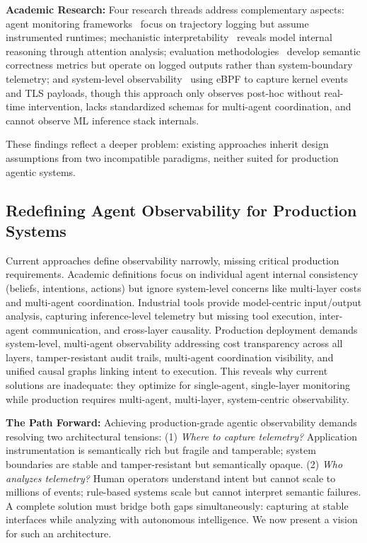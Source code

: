 \documentclass[sigplan,screen,9pt]{acmart}
\begin{document}
\textbf{Academic Research:} Four research threads address complementary aspects: agent monitoring frameworks~\cite{Rombaut2025Watson,Dong2024AgentOps} focus on trajectory logging but assume instrumented runtimes; mechanistic interpretability~\cite{Kim2025AgenticInterp} reveals model internal reasoning through attention analysis; evaluation methodologies~\cite{Moshkovich2025Pipeline} develop semantic correctness metrics but operate on logged outputs rather than system-boundary telemetry; and system-level observability~\cite{zheng2025agentsight} using eBPF to capture kernel events and TLS payloads, though this approach only observes post-hoc without real-time intervention, lacks standardized schemas for multi-agent coordination, and cannot observe ML inference stack internals.

These findings reflect a deeper problem: existing approaches inherit design assumptions from two incompatible paradigms, neither suited for production agentic systems.

\subsection{Redefining Agent Observability for Production Systems}

Current approaches define observability narrowly, missing critical production requirements. Academic definitions focus on individual agent internal consistency (beliefs, intentions, actions) but ignore system-level concerns like multi-layer costs and multi-agent coordination. Industrial tools provide model-centric input/output analysis, capturing inference-level telemetry but missing tool execution, inter-agent communication, and cross-layer causality. Production deployment demands system-level, multi-agent observability addressing cost transparency across all layers, tamper-resistant audit trails, multi-agent coordination visibility, and unified causal graphs linking intent to execution. This reveals why current solutions are inadequate: they optimize for single-agent, single-layer monitoring while production requires multi-agent, multi-layer, system-centric observability.

\textbf{The Path Forward:} Achieving production-grade agentic observability demands resolving two architectural tensions: (1) \emph{Where to capture telemetry?} Application instrumentation is semantically rich but fragile and tamperable; system boundaries are stable and tamper-resistant but semantically opaque. (2) \emph{Who analyzes telemetry?} Human operators understand intent but cannot scale to millions of events; rule-based systems scale but cannot interpret semantic failures. A complete solution must bridge both gaps simultaneously: capturing at stable interfaces while analyzing with autonomous intelligence. We now present a vision for such an architecture.
\end{document}
